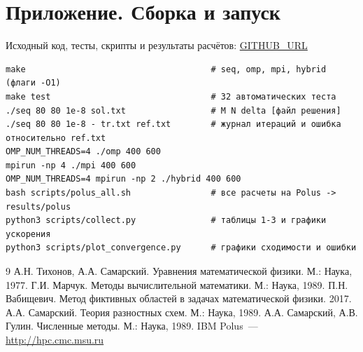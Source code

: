 \documentclass[12pt,a4paper]{article}
\begin{document}
\section*{Приложение. Сборка и запуск}
Исходный код, тесты, скрипты и результаты расчётов: \url{GITHUB_URL}
\begin{verbatim}
make                                     # seq, omp, mpi, hybrid (флаги -O1)
make test                                # 32 автоматических теста
./seq 80 80 1e-8 sol.txt                 # M N delta [файл решения]
./seq 80 80 1e-8 - tr.txt ref.txt        # журнал итераций и ошибка относительно ref.txt
OMP_NUM_THREADS=4 ./omp 400 600
mpirun -np 4 ./mpi 400 600
OMP_NUM_THREADS=4 mpirun -np 2 ./hybrid 400 600
bash scripts/polus_all.sh                # все расчеты на Polus -> results/polus
python3 scripts/collect.py               # таблицы 1-3 и графики ускорения
python3 scripts/plot_convergence.py      # графики сходимости и ошибки
\end{verbatim}

\begin{thebibliography}{9}
\bibitem{} А.Н. Тихонов, А.А. Самарский. Уравнения математической физики. М.: Наука, 1977.
\bibitem{} Г.И. Марчук. Методы вычислительной математики. М.: Наука, 1989.
\bibitem{} П.Н. Вабищевич. Метод фиктивных областей в задачах математической физики. 2017.
\bibitem{} А.А. Самарский. Теория разностных схем. М.: Наука, 1989.
\bibitem{} А.А. Самарский, А.В. Гулин. Численные методы. М.: Наука, 1989.
\bibitem{} IBM Polus~--- \url{http://hpc.cmc.msu.ru}
\end{thebibliography}
\end{document}
